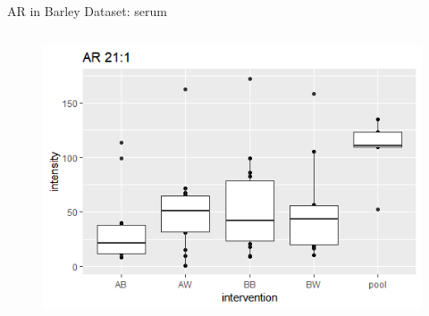 \documentclass{beamer}
\begin{document}
\begin{frame}{AR in Barley Dataset: serum}
\begin{columns}
		\begin{figure}[h]
		\centering
		\includegraphics[scale=0.4]{images/ar211.PNG}
	\end{figure}
	\end{columns}
\end{frame}
\end{document}
